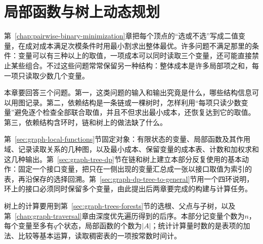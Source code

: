 \chapter{局部函数与树上动态规划}
\label{chap:local-functions-tree-dp}
\label{chap:graph-dynamic-programming}

第~\ref{chap:pairwise-binary-minimization}章把每个顶点的“选或不选”写成二值变量，在成对成本满足次模条件时用最小割求出整体最优。许多问题不满足那里的条件：变量可以有三种以上的取值，一项成本可以同时读取三个变量，还可能直接禁止某些组合。不过这些问题常常保留另一种结构：整体成本是许多局部项之和，每一项只读取少数几个变量。

本章要回答三个问题。第一，这类问题的输入和输出究竟是什么，哪些结构信息可以用图记录。第二，依赖结构是一条链或一棵树时，怎样利用“每项只读少数变量”避免逐个检查全部联合取值，并且不但求出最小成本，还恢复达到它的取值。第三，依赖结构含环时，链和树上的做法缺了什么。

第~\ref{sec:graph-local-functions}节固定对象：有限状态的变量、局部函数及其作用域、记录读取关系的几种图，以及最小成本、保留变量的成本表、计数和加权求和这几种输出。第~\ref{sec:graph-tree-dp}节在链和树上建立本部分反复使用的基本动作：固定一个接口变量，把只在一侧出现的变量汇总成一张以接口取值为索引的表，再沿保存的选择回溯。第~\ref{sec:graph-dp-tree-to-general}节用一个四环说明，环上的接口必须同时保留多个变量，由此提出后两章要完成的构建与计算任务。

树上的计算要用到第~\ref{sec:graph-trees-forests}节的选根、父点与子树，以及第~\ref{chap:graph-traversal}章由深度优先遍历得到的后序。本部分记变量个数为$n$，每个变量至多有$q$个状态，局部函数的个数为$|A|$；统计计算量时数的是表项的加法、比较等基本运算，读取稠密表的一项按常数时间计。






